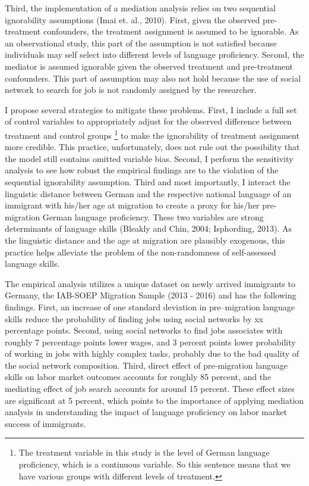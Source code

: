 \documentclass[12pt,a4paper]{article}
\begin{document}
Third, the implementation of a mediation analysis relies on two sequential ignorability assumptions (Imai et. al., 2010). First, given the observed pre-treatment confounders, the treatment assignment is assumed to be ignorable. As an observational study, this part of the assumption is not satisfied because individuals may self select into different levels of language proficiency. Second, the mediator is assumed ignorable given the observed treatment and pre-treatment confounders. This part of assumption may also not hold because the use of social network to search for job is not randomly assigned by the researcher.

I propose several strategies to mitigate these problems. First, I include a full set of control variables to appropriately adjust for the observed difference between treatment and control groups \footnote {\tiny {The treatment variable in this study is the level of German language proficiency, which is a continuous variable. So this sentence means that we have various groups with different levels of treatment.}} to make the ignorability of treatment assignment more credible. This practice, unfortunately, does not rule out the possibility that the model still contains omitted variable bias. Second, I perform the sensitivity analysis to see how robust the empirical findings are to the violation of the sequential ignorability assumption. Third and most importantly, I interact the linguistic distance between German and the respective national language of an immigrant with his/her age at migration to create a proxy for his/her pre-migration German language proficiency. These two variables are strong determinants of language skills (Bleakly and Chin, 2004; Isphording, 2013). As the linguistic distance and the age at migration are plausibly exogenous, this practice helps alleviate the problem of the non-randomness of self-assessed language skills.

The empirical analysis utilizes a unique dataset on newly arrived immigrants to Germany, the IAB-SOEP Migration Sample (2013 - 2016) and has the following findings. First, an increase of one standard deviation in pre--migration language skills reduce the probability of finding jobs using social networks by xx percentage points. Second, using social networks to find jobs associates with roughly 7 percentage points lower wages, and 3 percent points lower probability of working in jobs with highly complex tasks, probably due to the bad quality of the social network composition. Third, direct effect of pre-migration language skills on labor market outcomes accounts for roughly 85 percent, and the mediating effect of job search accounts for around 15 percent. These effect sizes are significant at 5 percent, which points to the importance of applying mediation analysis in understanding the impact of language proficiency on labor market success of immigrants.
\end{document}

